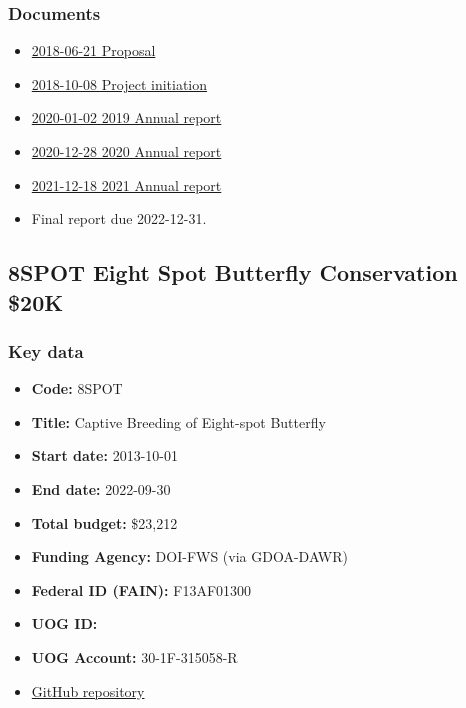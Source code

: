 \subsubsection{Documents}
\begin{itemize}
	\setlength\itemsep{0em}	
	\item \href{https://github.com/aubreymoore/McIntire-Stennis/raw/master/MS_Project_Proposal_2018/ms_proposal_2018.pdf}{2018-06-21 Proposal}
	\item \href{https://github.com/aubreymoore/McIntire-Stennis/raw/master/project_initiation.pdf}{2018-10-08 Project initiation}
	\item \href{https://github.com/aubreymoore/McIntire-Stennis/raw/master/2019-report.pdf}{2020-01-02 2019 Annual report}
	\item \href{https://github.com/aubreymoore/McIntire-Stennis/raw/master/2020\%20Annual\%20Report/2020\%20McS\%20Annual\%20Report.pdf}{2020-12-28 2020 Annual report}
	\item \href{https://github.com/aubreymoore/McIntire-Stennis/raw/master/2021\%20Annual\%20Report/submitted_for_review.pdf}{2021-12-18 2021 Annual report}
	\item Final report due 2022-12-31.
\end{itemize}





\newpage
\subsection{8SPOT Eight Spot Butterfly Conservation \$20K}
\label{8SPOT}
\subsubsection{Key data}
\begin{itemize}
	\setlength\itemsep{0em}
	\item \textbf{Code:} 8SPOT
	\item \textbf{Title:} Captive Breeding of Eight-spot Butterfly
	\item \textbf{Start date:} 2013-10-01
	\item \textbf{End date:} 2022-09-30
	\item \textbf{Total budget:} \$23,212
	\item \textbf{Funding Agency:} DOI-FWS (via GDOA-DAWR)
	\item \textbf{Federal ID (FAIN):} F13AF01300
	\item \textbf{UOG ID:}
	\item \textbf{UOG Account:} 30-1F-315058-R
	\item \href{https://github.com/aubreymoore/Hypolimnas-octocula-conservation}{GitHub repository}
\end{itemize}

